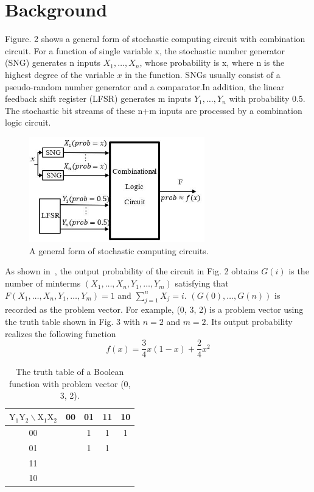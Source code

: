 \documentclass[conference,letterpaper]{IEEEtran}
\begin{document}
\section*{Background}
Figure. 2 shows a general form of stochastic computing circuit with combination circuit. For a function of single variable x, the stochastic number generator (SNG) generates n inputs $X_{1}, \ldots, X_{n}$, whose probability is x, where n is the highest degree of the variable $x$ in the function. SNGs usually consist of a pseudo-random number generator and a comparator.In addition, the linear feedback shift register (LFSR) generates m inputs $Y_{1}, \ldots, Y_{n}$ with probability 0.5. The stochastic bit streams of these n+m inputs are processed by a combination logic circuit.
\begin{figure}[htbp]
	\centering
	\includegraphics[width=3in]{fig/sc6.jpg}	
	\caption{A general form of stochastic computing circuits.} 
\end{figure}

As shown in~\cite{2}, the output probability of the circuit in Fig. 2 obtains $G(i)$ is the number of minterms $(X_{1}, \ldots, X_{n}, Y_{1}, \ldots, Y_{m})$ satisfying that $F(X_{1}, \ldots, X_{n}, Y_{1}, \ldots, Y_{m})=1$ and $\sum_{j=1}^{n} X_{j}=i$. $(G(0), \ldots, G(n))$ is recorded as the problem vector. For example, (0, 3, 2) is a problem vector using the truth table shown in Fig. 3 with $n=2$ and $m=2$. Its output probability realizes the following function
\begin{equation}
f(x)=\frac{3}{4} x(1-x)+\frac{2}{4} x^{2}
\end{equation}

\begin{table}[htbp]
\setlength{\abovecaptionskip}{0.cm}
\setlength{\belowcaptionskip}{0.pt}
\setlength{\tabcolsep}{1mm}
\caption{The truth table of a Boolean function with problem vector (0, 3, 2).}
\centering
\begin{tabular}{|c|c|c|c|c|}
\hline $\mathrm{Y}_{1} \mathrm{Y}_{2} \backslash \mathrm{X}_{1} \mathrm{X}_{2}$ & 00 & 01 & 11 & 10 \\
\hline 00 & & 1 & 1 & 1 \\
\hline 01 & & 1 & 1 & \\
\hline 11 & & & & \\
\hline 10 & & & & \\
\hline
\end{tabular}
\end{table}
\end{document}
